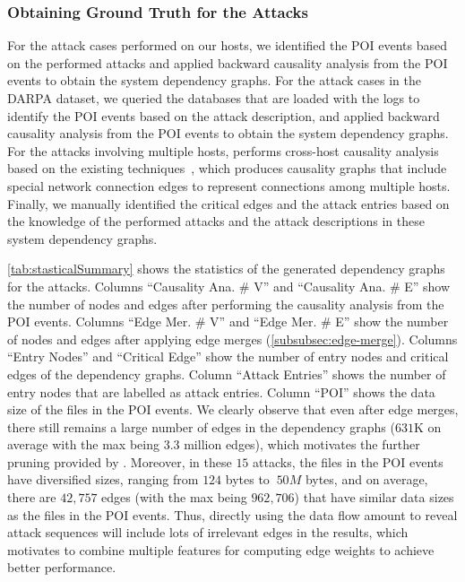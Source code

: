 \subsubsection{Obtaining Ground Truth for the Attacks}
For the attack cases performed on our hosts, we identified the POI events based on the performed attacks and applied backward causality analysis from the POI events to obtain the system dependency graphs.
For the attack cases in the DARPA dataset, we queried the databases that are loaded with the logs to identify the POI events based on the attack description, and applied backward causality analysis from the POI events to obtain the system dependency graphs.
For the attacks involving multiple hosts, \tool performs cross-host causality analysis based on the existing techniques~\cite{liu2018priotracker,backtracking2},
which produces causality graphs that include special network connection edges to represent connections among multiple hosts.
Finally, we manually identified the critical edges and the attack entries based on the knowledge of the performed attacks and the attack descriptions in these system dependency graphs.

\cref{tab:stasticalSummary} shows the statistics of the generated dependency graphs for the attacks. 
Columns ``Causality Ana. \# V'' and ``Causality Ana. \# E'' show the number of nodes and edges after performing the causality analysis from the POI events.
Columns ``Edge Mer. \# V'' and ``Edge Mer. \# E'' show the number of nodes and edges after applying edge merges (\cref{subsubsec:edge-merge}).
Columns ``Entry Nodes'' and  ``Critical Edge'' show the number of entry nodes and critical edges of the dependency graphs. 
Column ``Attack Entries'' shows the number of entry nodes that are labelled as attack entries.
Column ``POI'' shows the data size of the files in the POI events.
%
We clearly observe that even after edge merges, there still remains a large number of edges in the dependency graphs ($631$K on average with the max being $3.3$ million edges), which motivates the further pruning provided by \tool.
Moreover, in these $15$ attacks, the files in the POI events have diversified sizes, ranging from $124$ bytes to $~50M$ bytes, and on average, there are $42,757$ edges (with the max being $962,706$) that have similar data sizes as the files in the POI events.
Thus, directly using the data flow amount to reveal attack sequences will include lots of irrelevant edges in the results, which motivates \tool to combine multiple features for computing edge weights to achieve better performance.


